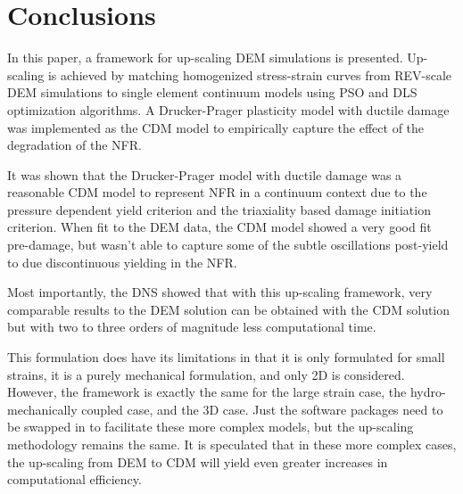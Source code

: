 \section{Conclusions}
In this paper, a framework for up-scaling DEM simulations is presented. Up-scaling is achieved by matching homogenized stress-strain curves from REV-scale DEM simulations to single element continuum models using PSO and DLS optimization algorithms. A Drucker-Prager plasticity model with ductile damage was implemented as the CDM model to empirically capture the effect of the degradation of the NFR.

It was shown that the Drucker-Prager model with ductile damage was a reasonable CDM model to represent NFR in a continuum context due to the pressure dependent yield criterion and the triaxiality based damage initiation criterion. When fit to the DEM data, the CDM model showed a very good fit pre-damage, but wasn't able to capture some of the subtle oscillations post-yield to due discontinuous yielding in the NFR.

Most importantly, the DNS showed that with this up-scaling framework, very comparable results to the DEM solution can be obtained with the CDM solution but with two to three orders of magnitude less computational time.

This formulation does have its limitations in that it is only formulated for small strains, it is a purely mechanical formulation, and only 2D is considered. However, the framework is exactly the same for the large strain case, the hydro-mechanically coupled case, and the 3D case. Just the software packages need to be swapped in to facilitate these more complex models, but the up-scaling methodology remains the same. It is speculated that in these more complex cases, the up-scaling from DEM to CDM will yield even greater increases in  computational efficiency. 











\clearpage